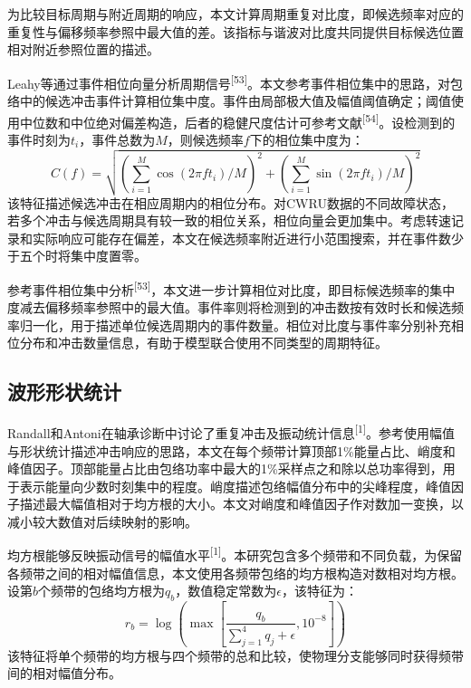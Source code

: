 \documentclass[UTF8,12pt,openany,twoside]{ctexbook}
\numberwithin{equation}{chapter}
\begin{document}
为比较目标周期与附近周期的响应，本文计算周期重复对比度，即候选频率对应的重复性与偏移频率参照中最大值的差。该指标与谐波对比度共同提供目标候选位置相对附近参照位置的描述。

Leahy等通过事件相位向量分析周期信号\textsuperscript{[53]}。本文参考事件相位集中的思路，对包络中的候选冲击事件计算相位集中度。事件由局部极大值及幅值阈值确定；阈值使用中位数和中位绝对偏差构造，后者的稳健尺度估计可参考文献\textsuperscript{[54]}。设检测到的事件时刻为$t_i$，事件总数为$M$，则候选频率$f$下的相位集中度为：
\begin{equation}
\label{eq:auto06}
C(f)=\sqrt{\left(\sum_{i=1}^{M}\cos(2\pi ft_i)/M\right)^2+\left(\sum_{i=1}^{M}\sin(2\pi ft_i)/M\right)^2}
\end{equation}
该特征描述候选冲击在相应周期内的相位分布。对CWRU数据的不同故障状态，若多个冲击与候选周期具有较一致的相位关系，相位向量会更加集中。考虑转速记录和实际响应可能存在偏差，本文在候选频率附近进行小范围搜索，并在事件数少于五个时将集中度置零。

参考事件相位集中分析\textsuperscript{[53]}，本文进一步计算相位对比度，即目标候选频率的集中度减去偏移频率参照中的最大值。事件率则将检测到的冲击数按有效时长和候选频率归一化，用于描述单位候选周期内的事件数量。相位对比度与事件率分别补充相位分布和冲击数量信息，有助于模型联合使用不同类型的周期特征。

\subsection{波形形状统计}\label{ux6ce2ux5f62ux5f62ux72b6ux7edfux8ba1}


Randall和Antoni在轴承诊断中讨论了重复冲击及振动统计信息\textsuperscript{[1]}。参考使用幅值与形状统计描述冲击响应的思路，本文在每个频带计算顶部1\%能量占比、峭度和峰值因子。顶部能量占比由包络功率中最大的1\%采样点之和除以总功率得到，用于表示能量向少数时刻集中的程度。峭度描述包络幅值分布中的尖峰程度，峰值因子描述最大幅值相对于均方根的大小。本文对峭度和峰值因子作对数加一变换，以减小较大数值对后续映射的影响。

均方根能够反映振动信号的幅值水平\textsuperscript{[1]}。本研究包含多个频带和不同负载，为保留各频带之间的相对幅值信息，本文使用各频带包络的均方根构造对数相对均方根。设第$b$个频带的包络均方根为$q_b$，数值稳定常数为$\epsilon$，该特征为：
\begin{equation}
\label{eq:auto07}
r_b=\log\!\left(\max\!\left[\frac{q_b}{\sum_{j=1}^{4}q_j+\epsilon},10^{-8}\right]\right)
\end{equation}
该特征将单个频带的均方根与四个频带的总和比较，使物理分支能够同时获得频带间的相对幅值分布。
\end{document}
